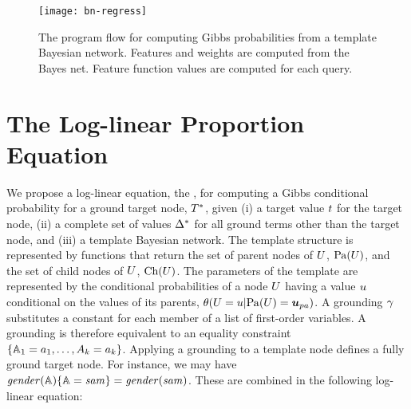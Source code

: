 \documentclass[runningheads,a4paper]{llncs}
\newcommand{\fixneeded}[1]{\textbf{[\footnotesize #1]}}
\begin{document}
\begin{figure}[t]

\begin{center}
\texttt{[image: bn-regress]}
\caption{The program flow for computing Gibbs probabilities from a template Bayesian network. Features and weights are computed from the Bayes net. Feature function values are computed for each query. \label{fig:bn-flow}}
\end{center}

\end{figure}


\section{The Log-linear Proportion Equation} 
\label{sec:theequation}

We propose a log-linear equation, the , for computing a Gibbs conditional probability for a ground target node, $T^{*}\hspace{0.0ex}$, given (i) a target value $t$ for the target node, (ii) a complete set of values $\Delta^{*}\hspace{0.0ex}$  for all ground terms other than the target node, and (iii) a template Bayesian network. The template structure is represented by functions that return the set of parent nodes of $U$, $\mathrm{Pa}(U)$, and the set of child nodes of $U$, $\mathrm{Ch}(U)$. The parameters of the template are
represented by the conditional probabilities of a node $U$ having a value $u$ conditional on the values of its parents, $\cprob{\UT = \UV}{\Pa{\UT} = \Prange{\UT}}$. A grounding $\gamma$ substitutes a constant for each member of a list of first-order variables. A grounding is therefore equivalent to an equality constraint $\{\mathbb{A}_{1} = a_{1},\ldots, A_{k} = a_{k}\}$. Applying a grounding to a template node defines a fully ground target node. For instance, we may have $\it{gender}(\mathbb{A}) \{\mathbb{A} = sam\} = \it{gender}(sam)$.  These are combined in the following log-linear equation:

%
\end{document}
